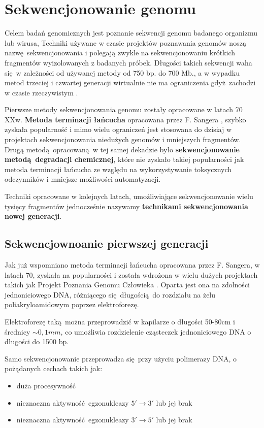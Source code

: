 \documentclass[two column, twoside, a4paper]{article}
\begin{document}
\section{Sekwencjonowanie genomu}

Celem badań genomicznych jest poznanie sekwencji genomu badanego organizmu lub wirusa, Techniki używane w czasie projektów poznawania genomów noszą nazwę sekwencjonowania i polegają zwykle na sekwencjonowaniu krótkich fragmentów wyizolowanych z badanych próbek. Długości takich sekwencji waha się w zależności od używanej metody od 750 bp. do 700 Mb., a w wypadku metod trzeciej i czwartej generacji wirtualnie nie ma ograniczenia gdyż zachodzi w czasie rzeczywistym \autocite{Brown2019}.

Pierwsze metody sekwencjonowania genomu zostały opracowane w latach 70 XXw. \textbf{Metoda terminacji łańcucha} opracowana przez F. Sangera \autocite{Sanger1977}, szybko zyskała popularność i mimo wielu ograniczeń jest stosowana do dzisiaj w projektach sekwencjonowania niedużych genomów \autocite{Brown2000} i mniejszych fragmentów. Drugą metodą opracowaną w tej samej dekadzie było \textbf{sekwencjonowanie metodą degradacji chemicznej}, które nie zyskało takiej popularności jak metoda terminacji łańcucha ze względu na wykorzystywanie toksycznych odczynników i mniejsze możliwości automatyzacji.

Techniki opracowane w kolejnych latach, umożliwiające sekwencjonowanie wielu tysięcy fragmentów jednocześnie nazywamy \textbf{technikami sekwencjonowania nowej generacji}.

\subsection{Sekwencjownoanie pierwszej generacji}

Jak już wspomniano metoda terminacji łańcucha opracowana przez F. Sangera, w latach 70, zyskała na popularności i została wdrożona w wielu dużych projektach takich jak Projekt Poznania Genomu Człowieka \autocite{IHGSC2001}. Oparta jest ona na zdolności jednoniciowego DNA, różniącego się długością do rozdziału na żelu poliakryloamidowym poprzez elektroforezę.

Elektroforezę taką można przeprowadzić w kapilarze o długości 50-80cm i średnicy $\sim 0,1mm$, co umożliwia rozdzielenie cząsteczek jednoniciowego DNA o długości do 1500 bp.

Samo sekwencjonowanie przeprowadza się przy użyciu polimerazy DNA, o pożądanych cechach takich jak:
\begin{itemize}
\item duża procesywność
\item nieznaczna aktywność egzonukleazy $5'\rightarrow3'$ lub jej brak
\item nieznaczna aktywność egzonukleazy $3'\rightarrow5'$ lub jej brak
\end{itemize}
\end{document}
